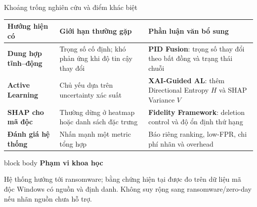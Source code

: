 \documentclass[aspectratio=169,10pt]{beamer}
\newenvironment{bluebox}[1]{%
  \begin{beamercolorbox}[rounded=true,shadow=true,sep=0.18cm]{block body}%
  {\color{uetblue}\textbf{#1}}\par\vspace{0.08cm}\color{ink}%
}{\end{beamercolorbox}}
\begin{document}
\begin{frame}[t]{Khoảng trống nghiên cứu và điểm khác biệt}
\scriptsize
\renewcommand{\arraystretch}{1.32}
\begin{tabularx}{\textwidth}{>{\bfseries}p{2.3cm} X X}
\toprule
Hướng hiện có & Giới hạn thường gặp & Phần luận văn bổ sung \\
\midrule
Dung hợp tĩnh--động & Trọng số cố định; khó phản ứng khi độ tin cậy thay đổi & \textbf{PID Fusion}: trọng số thay đổi theo bất đồng và trạng thái chuỗi \\
Active Learning & Chủ yếu dựa trên uncertainty xác suất & \textbf{XAI-Guided AL}: thêm Directional Entropy $H$ và SHAP Variance $V$ \\
SHAP cho mã độc & Thường dừng ở heatmap hoặc danh sách đặc trưng & \textbf{Fidelity Framework}: deletion control và độ ổn định thứ hạng \\
Đánh giá hệ thống & Nhấn mạnh một metric tổng hợp & Báo riêng ranking, low-FPR, chi phí nhãn và overhead \\
\bottomrule
\end{tabularx}

\vspace{0.42cm}
\begin{bluebox}{Phạm vi khoa học}
Hệ thống hướng tới ransomware; bằng chứng hiện tại được đo trên dữ liệu mã độc Windows có nguồn và định danh. Không suy rộng sang ransomware/zero-day nếu nhãn nguồn chưa hỗ trợ.
\end{bluebox}
\end{frame}
\end{document}
